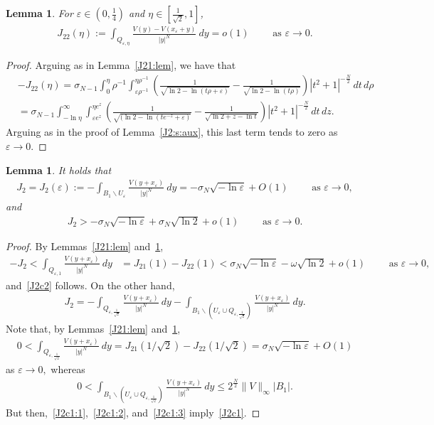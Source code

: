 \documentclass[11pt]{article}
\newcommand{\eps}{{\varepsilon}}
\numberwithin{equation}{section}
\newtheorem{lemma}[theorem]{Lemma}
\begin{document}
\begin{lemma}\label{J22:lem}
For $\eps\in(0,\frac{1}{4})$ and $\eta\in[\frac{1}{\sqrt{2}},1]$,
\begin{align*}
J_{22}(\eta):=\int_{Q_{\eps,\eta}} \frac{V(y)-V(x_\eps+y)}{|y|^N}\ dy=o(1)\qquad \text{ as }\eps\to 0.
\end{align*}
\end{lemma}
\begin{proof}
Arguing as in Lemma~\ref{J21:lem}, we have that
\begin{align*}
    &-J_{22}(\eta)
    =\sigma_{N-1} \int_0^\eta  \rho^{-1}  \int_{\eps\rho^{-1}}^{\eta \rho^{-1}} 
    \left(
    \frac{1}{
    \sqrt{\ln 2-\ln (t\rho+\eps)}}
    -
    \frac{1}{\sqrt{\ln 2-\ln(t\rho)}}\right)|t^2+1|^{-\frac{N}{2}}\, dt\,d\rho\\
    &=\sigma_{N-1}\int_{-\ln \eta}^\infty\int_{\eps e^z}^{\eta e^z} 
    \left(
    \frac{1}{\sqrt{(\ln 2-\ln(te^{-z}+\eps)}}
    -\frac{1}{\sqrt{\ln 2+z-\ln t}}\right)|t^2+1|^{-\frac{N}{2}}\, dt\,dz.
\end{align*}
Arguing as in the proof of Lemma~\ref{J2:s:aux}, this last term tends to zero as $\eps \to 0$.
\end{proof}

\begin{lemma}\label{J2}
It holds that
\begin{align}\label{J2c1}
J_2=J_2(\eps):=-\int_{B_1\backslash U_\eps} \frac{V(y+x_\eps)}{|y|^N}\ dy=-\sigma_N\sqrt{-\ln \eps}+O(1)\qquad \text{ as }\eps\to 0,
\end{align}
and
\begin{align}\label{J2c2}
J_2>-\sigma_N\sqrt{-\ln\eps}+\sigma_N\sqrt{\ln 2}+o(1)\qquad \text{ as }\eps\to 0.
\end{align}
\end{lemma}
\begin{proof}
By Lemmas~\ref{J21:lem} and~\ref{J22:lem},
\begin{align*}
-J_2<\int_{Q_{\eps,1}}\frac{V(y+x_\eps)}{|y|^N}\ dy&=J_{21}(1)-J_{22}(1)<\sigma_N\sqrt{-\ln\eps}-\omega\sqrt{\ln 2}+o(1)\qquad \text{ as }\eps\to 0,
 \end{align*}
 and~\eqref{J2c2} follows. On the other hand,
 \begin{align}\label{J2c1:1}
 J_2=-\int_{Q_{\eps,\frac{1}{\sqrt{2}}}}\frac{V(y+x_\eps)}{|y|^N}\ dy-\int_{B_1\backslash (U_\eps\cup Q_{\eps,\frac{1}{\sqrt{2}}})}\frac{V(y+x_\eps)}{|y|^N}\ dy.
 \end{align}
 Note that, by Lemmas~\ref{J21:lem} and~\ref{J22:lem},
 \begin{align}\label{J2c1:2}
 0<\int_{Q_{\eps,\frac{1}{\sqrt{2}}}}\frac{V(y+x_\eps)}{|y|^N}\ dy
 =J_{21}(1/\sqrt{2})-J_{22}(1/\sqrt{2})
 =\sigma_N\sqrt{-\ln\eps}+O(1)
 \end{align}
 as $\eps\to 0,$ whereas
 \begin{align}\label{J2c1:3}
0<\int_{B_1\backslash (U_\eps\cup Q_{\eps,\frac{1}{\sqrt{2}}})}\frac{V(y+x_\eps)}{|y|^N}\ dy
\leq 2^\frac{N}{2} \|V\|_\infty |B_1|.
 \end{align}
 But then,~\eqref{J2c1:1},~\eqref{J2c1:2}, and~\eqref{J2c1:3} imply~\eqref{J2c1}.
\end{proof}
\end{document}
